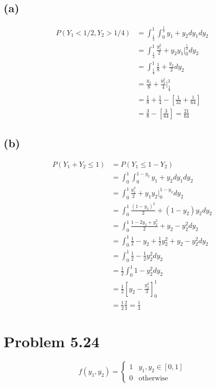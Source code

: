 \documentclass{article}
\theoremstyle{definition}
\begin{document}
    \subsection*{(a)}
        \begin{align*}
            P(Y_1 < 1 / 2, Y_2 > 1 / 4)
            &= \int_\frac{1}{4}^1 \int_0^\frac{1}{2} y_1 + y_2 dy_1 dy_2 \\
            &= \int_\frac{1}{4}^1 \frac{y_1^2}{2} + y_2 y_1 \bigg|_0^\frac{1}{2} dy_2 \\
            &= \int_\frac{1}{4}^1 \frac{1}{8} + \frac{y_2}{2} dy_2 \\
            &= \frac{y_2}{8} + \frac{y_2^2}{4} \bigg|_\frac{1}{4}^1\\
            &= \frac{1}{8} + \frac{1}{4} - [\frac{1}{32} + \frac{1}{64}]\\
            &= \frac{3}{8} - [\frac{3}{64}] = \frac{21}{64}
        \end{align*}

    \subsection*{(b)}
        \begin{align*}
            P(Y_1 + Y_2 \leqslant 1) &= P(Y_1 \leqslant 1 - Y_2) \\
            &= \int_0^1 \int_0^{1 - y_2} y_1 + y_2 dy_1 dy_2 \\
            &= \int_0^1 \frac{y_1^2}{2} + y_1 y_2 \bigg|_0^{1 - y_2} dy_2 \\
            &= \int_0^1 \frac{(1-y_2)^2}{2} + (1-y_2) y_2  dy_2 \\
            &= \int_0^1 \frac{1 -2y_2 + y_2^2}{2} + y_2 - y_2^2 dy_2 \\
            &= \int_0^1 \frac{1}{2} - y_2 + \frac{1}{2}y_2^2 + y_2 - y_2^2 dy_2 \\
            &= \int_0^1 \frac{1}{2} - \frac{1}{2}y_2^2 dy_2 \\
            &= \frac{1}{2} \int_0^1 1 - y_2^2 dy_2 \\
            &= \frac{1}{2} \left[y_2 - \frac{y_2^3}{3} \right]_0^1 \\
            &= \frac{1}{2} \frac{2}{3} = \frac{1}{3}
        \end{align*}

\section*{Problem 5.24}
    \[
        f(y_1, y_2) = 
        \begin{cases}
            1 & y_1,y_2 \in [0,1]\\
            0 & \text{otherwise}
        \end{cases}
    \]
\end{document}
